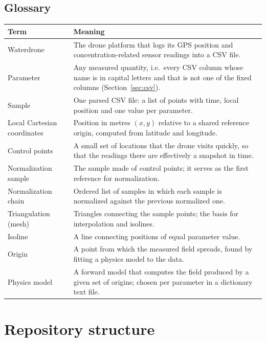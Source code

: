 \documentclass{article}
\begin{document}
\subsection{Glossary}

{\small
\begin{longtable}{@{}p{}p{}@{}}
\toprule
\textbf{Term} & \textbf{Meaning}\\
\midrule
\endhead
Waterdrone & The drone platform that logs its GPS position and
  concentration-related sensor readings into a CSV file.\\
Parameter & Any measured quantity, i.e.\ every CSV column whose name is in
  capital letters and that is not one of the fixed columns
  (Section~\ref{sec:csv}).\\
Sample & One parsed CSV file: a list of points with time, local position
  and one value per parameter.\\
Local Cartesian coordinates & Position in metres $(x,y)$ relative to a shared
  reference origin, computed from latitude and longitude.\\
Control points & A small set of locations that the drone visits quickly, so
  that the readings there are effectively a snapshot in time.\\
Normalization sample & The sample made of control points; it serves as the
  first reference for normalization.\\
Normalization chain & Ordered list of samples in which each sample is
  normalized against the previous normalized one.\\
Triangulation (mesh) & Triangles connecting the sample points; the basis for
  interpolation and isolines.\\
Isoline & A line connecting positions of equal parameter value.\\
Origin & A point from which the measured field spreads, found by fitting a
  physics model to the data.\\
Physics model & A forward model that computes the field produced by a given
  set of origins; chosen per parameter in a dictionary text file.\\
\bottomrule
\end{longtable}
}

\section{Repository structure}
\label{sec:repo}
\end{document}
